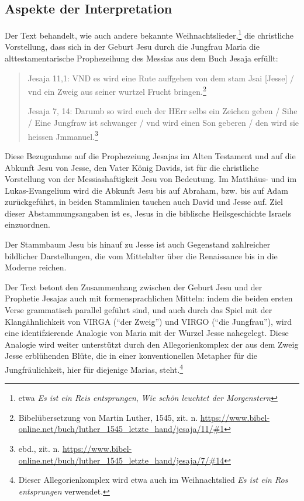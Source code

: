 \documentclass[a4paper]{book}
\begin{document}
\begin{samepage}

\subsection{Aspekte der Interpretation}

\begin{multicols}{2}

Der Text behandelt, wie auch andere bekannte Weihnachtslieder,\footnote{etwa \emph{Es ist ein Reis entsprungen}, \emph{Wie schön leuchtet der Morgenstern}} die christliche Vorstellung, dass sich in der Geburt Jesu durch die Jungfrau Maria die alttestamentarische Prophezeihung des Messias aus dem Buch Jesaja erfüllt: 

\begin{quote}
Jesaja 11,1: VND es wird eine Rute auffgehen von dem stam Jsai [Jesse] / vnd ein Zweig aus seiner wurtzel Frucht bringen.\footnote{Bibelübersetzung von Martin Luther, 1545, zit. n. \url{https://www.bibel-online.net/buch/luther_1545_letzte_hand/jesaja/11/\#1}}

Jesaja 7, 14: Darumb so wird euch der HErr selbs ein Zeichen geben / Sihe / Eine Jungfraw ist schwanger / vnd wird einen Son geberen / den wird sie heissen Jmmanuel.\footnote{ebd., zit. n. \url{https://www.bibel-online.net/buch/luther_1545_letzte_hand/jesaja/7/\#14}}
\end{quote}

Diese Bezugnahme auf die Prophezeiung Jesajas im Alten Testament und auf die Abkunft Jesu von Jesse, den Vater König Davids, ist für die christliche Vorstellung von der Messiashaftigkeit Jesu von Bedeutung. Im Matthäus- und im Lukas-Evangelium wird die Abkunft Jesu bis auf Abraham, bzw. bis auf Adam zurückgeführt, in beiden Stammlinien tauchen auch David und Jesse auf. Ziel dieser Abstammungsangaben ist es, Jesus in die biblische Heilsgeschichte Israels einzuordnen. 

Der Stammbaum Jesu bis hinauf zu Jesse ist auch Gegenstand zahlreicher bildlicher Darstellungen, die vom Mittelalter über die Renaissance bis in die Moderne reichen.

Der Text betont den Zusammenhang zwischen der Geburt Jesu und der Prophetie Jesajas auch mit formensprachlichen Mitteln: indem die beiden ersten Verse grammatisch parallel geführt sind, und auch durch das Spiel mit der Klangähnlichkeit von VIRGA (\enquote{der Zweig}) und VIRGO (\enquote{die Jungfrau}), wird eine identifzierende Analogie von Maria mit der Wurzel Jesse nahegelegt. Diese Analogie wird weiter unterstützt durch den Allegorienkomplex der aus dem Zweig Jesse erblühenden Blüte, die in einer konventionellen Metapher für die Jungfräulichkeit, hier für diejenige Marias, steht.\footnote{Dieser Allegorienkomplex wird etwa auch im Weihnachtslied \emph{Es ist ein Ros entsprungen} verwendet.}

\end{multicols}

\end{samepage}
\end{document}
